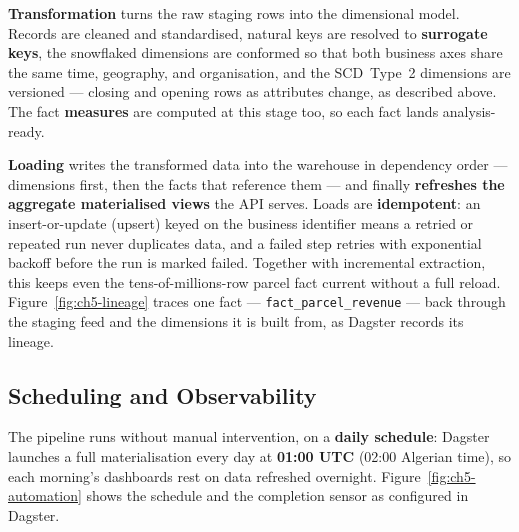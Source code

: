 \textbf{Transformation} turns the raw staging rows into the dimensional model. Records are cleaned and
standardised, natural keys are resolved to \textbf{surrogate keys}, the snowflaked dimensions are
conformed so that both business axes share the same time, geography, and organisation, and the
SCD~Type~2 dimensions are versioned --- closing and opening rows as attributes change, as described
above. The fact \textbf{measures} are computed at this stage too, so each fact lands analysis-ready.

\textbf{Loading} writes the transformed data into the warehouse in dependency order --- dimensions
first, then the facts that reference them --- and finally \textbf{refreshes the aggregate materialised
views} the API serves. Loads are \textbf{idempotent}: an insert-or-update (upsert) keyed on the business
identifier means a retried or repeated run never duplicates data, and a failed step retries with
exponential backoff before the run is marked failed. Together with incremental extraction, this keeps
even the tens-of-millions-row parcel fact current without a full reload.
Figure~\ref{fig:ch5-lineage} traces one fact --- \texttt{fact\_parcel\_revenue} --- back through the
staging feed and the dimensions it is built from, as Dagster records its lineage.


\subsection{Scheduling and Observability}

The pipeline runs without manual intervention, on a \textbf{daily schedule}: Dagster launches a full
materialisation every day at \textbf{01:00 UTC} (02:00 Algerian time), so each morning's dashboards rest
on data refreshed overnight. Figure~\ref{fig:ch5-automation} shows the schedule and the completion sensor
as configured in Dagster.


